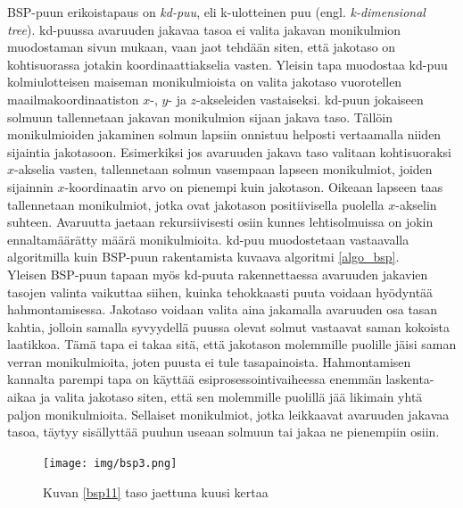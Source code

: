\documentclass[a4paper, 12pt, titlepage]{article}
\begin{document}
BSP-puun erikoistapaus on \emph{kd-puu}, eli k-ulotteinen puu (engl. \emph{k-dimensional tree}). 
kd-puussa avaruuden jakavaa tasoa ei valita jakavan monikulmion muodostaman sivun mukaan, vaan jaot tehdään siten, että jakotaso on kohtisuorassa  jotakin koordinaattiakselia vasten. Yleisin tapa muodostaa kd-puu kolmiulotteisen maiseman monikulmioista on valita jakotaso vuorotellen maailmakoordinaatiston $x$-, $y$- ja $z$-akseleiden vastaiseksi. kd-puun jokaiseen solmuun tallennetaan  
jakavan monikulmion sijaan jakava taso. Tällöin monikulmioiden jakaminen solmun lapsiin onnistuu helposti vertaamalla niiden sijaintia jakotasoon. Esimerkiksi jos avaruuden jakava taso valitaan kohtisuoraksi $x$-akselia vasten, tallennetaan solmun vasempaan lapseen monikulmiot, joiden sijainnin $x$-koordinaatin arvo on pienempi kuin jakotason. Oikeaan lapseen taas tallennetaan monikulmiot, jotka ovat jakotason positiivisella puolella $x$-akselin suhteen. \citep[.]{samet} Avaruutta jaetaan rekursiivisesti osiin kunnes lehtisolmuissa on jokin ennaltamäärätty määrä monikulmioita. kd-puu muodostetaan vastaavalla algoritmilla kuin BSP-puun rakentamista kuvaava algoritmi \ref{algo_bsp}.\\

Yleisen BSP-puun tapaan myös kd-puuta rakennettaessa avaruuden jakavien tasojen valinta vaikuttaa siihen, kuinka tehokkaasti puuta voidaan hyödyntää hahmontamisessa. Jakotaso voidaan valita aina jakamalla avaruuden osa tasan kahtia, jolloin samalla syvyydellä puussa olevat solmut vastaavat saman kokoista laatikkoa. Tämä tapa ei takaa sitä, että jakotason molemmille puolille jäisi saman verran monikulmioita, joten puusta ei tule tasapainoista. Hahmontamisen kannalta parempi tapa on käyttää esiprosessointivaiheessa enemmän laskenta-aikaa ja valita jakotaso siten, että sen molemmille puolillä jää likimain yhtä paljon monikulmioita. Sellaiset monikulmiot, jotka leikkaavat avaruuden jakavaa tasoa, täytyy sisällyttää puuhun useaan solmuun tai jakaa ne pienempiin osiin. \citep[.]{havran}\\

\begin{figure}
 \centering 
 \texttt{[image: img/bsp3.png]}
 \caption{Kuvan \ref{bsp11} taso jaettuna kuusi kertaa}
 \vspace{-0.5cm} 
 \label{bsp3}
\end{figure}
\end{document}
